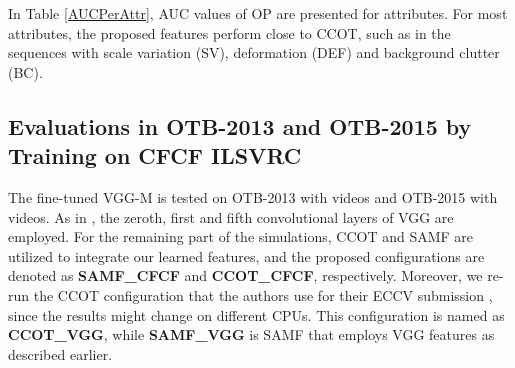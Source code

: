 \documentclass[journal]{IEEEtran}
\begin{document}
In Table \ref{AUCPerAttr}, AUC values of OP are presented for  attributes. For most attributes, the proposed features perform close to CCOT, such as in the sequences with scale variation (SV), deformation (DEF) and background clutter (BC).
\begin{table}
\caption{\label{AUCPerAttr}\small AUC values for 11 attributes of the 40 sequences \cite{Benchmark2013}.}
\normalsize
{}
\end{table}
\subsection{Evaluations in OTB-2013 and OTB-2015 by Training on CFCF ILSVRC}
The fine-tuned VGG-M is tested on OTB-2013 with  videos and OTB-2015 with  videos. As in \cite{CCOT}, the zeroth, first and fifth convolutional layers of VGG are employed. For the remaining part of the simulations, CCOT \cite{CCOT} and SAMF \cite{SAMF} are utilized to integrate our learned features, and the proposed configurations are denoted as \textbf{SAMF\_CFCF} and \textbf{CCOT\_CFCF}, respectively. Moreover, we re-run the CCOT configuration that the authors use for their ECCV submission \cite{CCOT}, since the results might change on different CPUs. This configuration is named as \textbf{CCOT\_VGG}, while \textbf{SAMF\_VGG} is SAMF that employs VGG features as described earlier.
\end{document}
